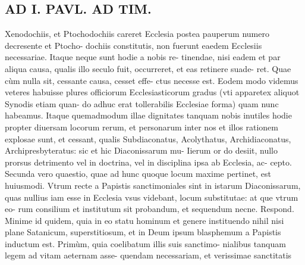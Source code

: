 \documentclass{article}
\begin{document}
\begin{pages}
\section*{AD I. PAVL. AD TIM. }
\marginpar{[ p.290 ]}\pstart Xenodochiis, et Ptochodochiis careret Ecclesia postea pauperum numero decresente et Ptocho- dochiis constitutis, non fuerunt eaedem Ecclesiis necessariae. Itaque neque sunt hodie a nobis re- tinendae, nisi eadem et par aliqua causa, qualis illo seculo fuit, occurreret, et eas retinere suade- ret. Quae cùm nulla sit, cessante causa, cesset effe- ctus necesse est. Eodem modo videmus veteres habuisse plures officiorum Ecclesiasticorum gradus (vti apparetex aliquot Synodis etiam quan- do adhuc erat tollerabilis Ecclesiae forma) quam nunc habeamus. Itaque quemadmodum illae dignitates tanquam nobis inutiles hodie propter diuersam locorum rerum, et personarum inter nos et illos rationem explosae sunt, et cessant, qualis Subdiaconatus, Acolythatus, Archidiaconatus, Archipresbyteratus: sic et hic Diaconissarum mu- Iierum or do desiit, nullo prorsus detrimento vel in doctrina, vel in disciplina ipsa ab Ecclesia, ac- cepto.  \pend\pstart Secunda vero quaestio, quae ad hunc quoque locum maxime pertinet, est huiusmodi. Vtrum recte a Papistis sanctimoniales sint in istarum Diaconissarum, quas nullius iam esse in Ecclesia vsus videbant, locum substitutae: at que vtrum eo- rum consilium et institutum sit probandum, et sequendum necne. Respond. Minime id quidem, quia in eo statu hominum et genere instituendo nihil nisi plane Satanicum, superstitiosum, et in Deum ipsum blasphemum a Papistis inductum est. Primùm, quia coelibatum illis suis sanctimo- nialibus tanquam legem ad vitam aeternam asse- quendam necessariam, et verissimae sanctitatis  \pend

\end{pages}
\end{document}
